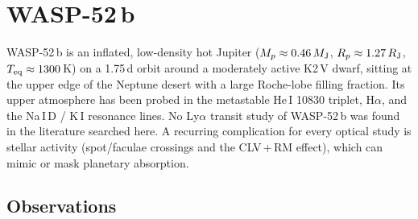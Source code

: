 \section{WASP-52\,b}
\label{sec:wasp52b}

WASP-52\,b is an inflated, low-density hot Jupiter ($M_p\approx0.46\,M_{\rm J}$,
$R_p\approx1.27\,R_{\rm J}$, $T_{\rm eq}\approx1300$\,K) on a 1.75\,d orbit around a
moderately active K2\,V dwarf, sitting at the upper edge of the Neptune desert with a
large Roche-lobe filling fraction. Its upper atmosphere has been probed in the
metastable He\,I 10830 triplet, H$\alpha$, and the Na\,I\,D / K\,I resonance lines.
No Ly$\alpha$ transit study of WASP-52\,b was found in the literature searched here.
A recurring complication for every optical study is stellar activity
(spot/faculae crossings and the CLV\,+\,RM effect), which can mimic or mask planetary
absorption.

\subsection{Observations}

